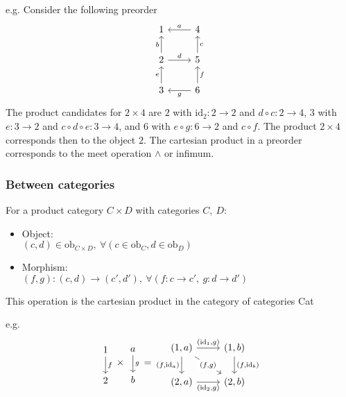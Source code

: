 e.g.
Consider the following preorder
\[\begin{tikzcd}
	1 & 4 \\
	2 & 5 \\
	3 & 6
	\arrow["g", from=3-2, to=3-1]
	\arrow["f"', from=3-2, to=2-2]
	\arrow["c"', from=2-2, to=1-2]
	\arrow["e", from=3-1, to=2-1]
	\arrow["b", from=2-1, to=1-1]
	\arrow["a"', from=1-2, to=1-1]
	\arrow["d", from=2-1, to=2-2]
\end{tikzcd}\]
The product candidates for $2\times 4$ are $2$ with $\mathrm{id}_2 : 2\to 2$
and $d\circ c:2\to 4$, $3$ with $e: 3\to 2$ and $c\circ d\circ e: 3\to 4$,
and $6$ with $e \circ g: 6\to 2$ and $c\circ f$. The product $2\times 4$
corresponds then to the object $2$. The cartesian product in a
preorder corresponds to the meet operation $\land$ or infimum.
\cite{7sketches_compositionality}

\subsubsection{Between categories}
\cite{nlab:product_category} For a product category $C\times D$ with categories
$C,\ D$:
\begin{itemize}
  \item Object:\\
    $(c, d) \in \mathrm{ob}_{C\times D},\ \forall (c \in \mathrm{ob}_C, d \in \mathrm{ob}_D)$
  \item Morphism:\\
    $(f,g) : (c,d) \to (c', d'),\ \forall (f: c \to c',\ g:d \to d')$
\end{itemize}
This operation is the cartesian product in the category of categories Cat

e.g.
\[
\begin{tikzcd}
	1 \\
	2
	\arrow["f", from=1-1, to=2-1]
\end{tikzcd}
\times
\begin{tikzcd}
	a \\
	b
	\arrow["g", from=1-1, to=2-1]
\end{tikzcd}
=
\begin{tikzcd}
	{(1,a)} & {(1,b)} \\
	{(2,a)} & {(2,b)}
	\arrow["{(\mathrm{id}_1,g)}", from=1-1, to=1-2]
	\arrow["{(f,\mathrm{id}_a)}"', from=1-1, to=2-1]
	\arrow["{(\mathrm{id}_2,g)}"', from=2-1, to=2-2]
	\arrow["{(f,\mathrm{id}_b)}", from=1-2, to=2-2]
	\arrow["{(f,g)}"{description}, from=1-1, to=2-2]
\end{tikzcd}
\]
